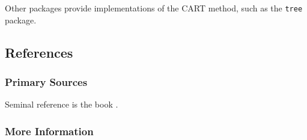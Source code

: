 Other packages provide implementations of the CART method, such as the \texttt{tree} package.


\subsection{References}

\subsubsection{Primary Sources}

Seminal reference is the book \cite{Breiman1984}.

\subsubsection{More Information}



